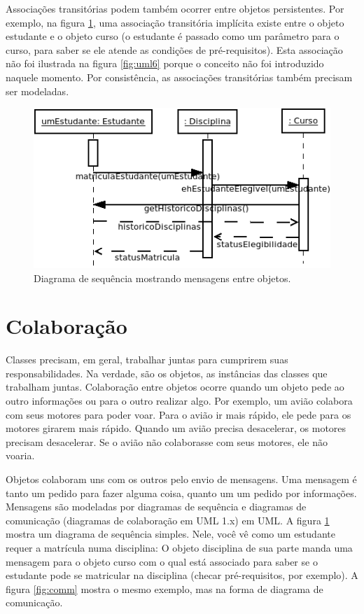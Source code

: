 \documentclass[
	11pt,				%
	openright,
	twoside,			%
	a4paper,			%
	english,			%
	french,
	brazil,				%
	sumario=tradicional
	]{abntex2}
\begin{document}
Associações transitórias podem também ocorrer entre objetos persistentes. Por exemplo, na figura \ref{fig:seq}, uma associação transitória implícita
existe entre o objeto estudante e o objeto curso (o estudante é passado como um parâmetro para o curso, para saber se ele atende as condições de pré-requisitos). Esta associação não foi ilustrada na figura \ref{fig:uml6} porque o conceito não foi introduzido naquele momento. Por consistência, as associações transitórias também  precisam ser modeladas.

\begin{figure}
\begin{center}
\includegraphics[scale=0.65]{clsSeq.png}
\end{center}
\caption{Diagrama de sequência mostrando mensagens entre objetos.} \label{fig:seq}
\end{figure}

\section{Colaboração}

Classes precisam, em geral, trabalhar juntas para cumprirem suas responsabilidades. Na verdade, são os objetos, as instâncias das classes que trabalham juntas. Colaboração entre objetos ocorre quando um objeto pede ao outro informações ou para o outro realizar algo. Por exemplo, um avião colabora com seus motores para poder voar. Para o avião ir mais rápido, ele pede para os motores girarem mais rápido. Quando um avião precisa desacelerar, os motores precisam desacelerar. Se o avião não colaborasse com seus motores, ele não voaria.

Objetos colaboram uns com os outros pelo envio de mensagens. Uma mensagem é tanto um pedido para fazer alguma coisa, quanto um um pedido por informações. Mensagens são modeladas por diagramas de sequência e diagramas de comunicação (diagramas de colaboração em UML 1.x) em UML. A figura \ref{fig:seq} mostra um diagrama de sequência simples. Nele, você vê como um estudante requer a matrícula numa disciplina: O objeto disciplina de sua parte manda uma mensagem para o objeto curso com o qual está associado para saber se o estudante pode se matricular na disciplina (checar pré-requisitos, por exemplo). A figura \ref{fig:comm} mostra o mesmo exemplo, mas na forma de diagrama de comunicação.
\end{document}
